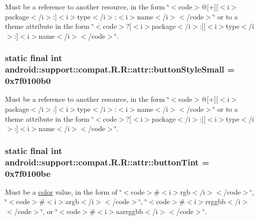 Must be a reference to another resource, in the form \char`\"{}$<$code$>$@\mbox{[}+\mbox{]}\mbox{[}$<$i$>$package$<$/i$>$:\mbox{]}$<$i$>$type$<$/i$>$:$<$i$>$name$<$/i$>$$<$/code$>$\char`\"{} or to a theme attribute in the form \char`\"{}$<$code$>$?\mbox{[}$<$i$>$package$<$/i$>$:\mbox{]}\mbox{[}$<$i$>$type$<$/i$>$:\mbox{]}$<$i$>$name$<$/i$>$$<$/code$>$\char`\"{}. \hypertarget{classandroid_1_1support_1_1compat_1_1_r_1_1attr_4a3c61bfe6c2e53ff2be3a1f1d0fbd5a}{
\subsubsection[{buttonStyleSmall}]{\setlength{\rightskip}{0pt plus 5cm}static final int android::support::compat.R.R::attr::buttonStyleSmall = 0x7f0100b0}}
\label{classandroid_1_1support_1_1compat_1_1_r_1_1attr_4a3c61bfe6c2e53ff2be3a1f1d0fbd5a}


Must be a reference to another resource, in the form \char`\"{}$<$code$>$@\mbox{[}+\mbox{]}\mbox{[}$<$i$>$package$<$/i$>$:\mbox{]}$<$i$>$type$<$/i$>$:$<$i$>$name$<$/i$>$$<$/code$>$\char`\"{} or to a theme attribute in the form \char`\"{}$<$code$>$?\mbox{[}$<$i$>$package$<$/i$>$:\mbox{]}\mbox{[}$<$i$>$type$<$/i$>$:\mbox{]}$<$i$>$name$<$/i$>$$<$/code$>$\char`\"{}. \hypertarget{classandroid_1_1support_1_1compat_1_1_r_1_1attr_89b616b07afa9c481b26684cfc4838c8}{
\subsubsection[{buttonTint}]{\setlength{\rightskip}{0pt plus 5cm}static final int android::support::compat.R.R::attr::buttonTint = 0x7f0100be}}
\label{classandroid_1_1support_1_1compat_1_1_r_1_1attr_89b616b07afa9c481b26684cfc4838c8}


Must be a \hyperlink{classandroid_1_1support_1_1compat_1_1_r_1_1color}{color} value, in the form of \char`\"{}$<$code$>$\#$<$i$>$rgb$<$/i$>$$<$/code$>$\char`\"{}, \char`\"{}$<$code$>$\#$<$i$>$argb$<$/i$>$$<$/code$>$\char`\"{}, \char`\"{}$<$code$>$\#$<$i$>$rrggbb$<$/i$>$$<$/code$>$\char`\"{}, or \char`\"{}$<$code$>$\#$<$i$>$aarrggbb$<$/i$>$$<$/code$>$\char`\"{}. 

